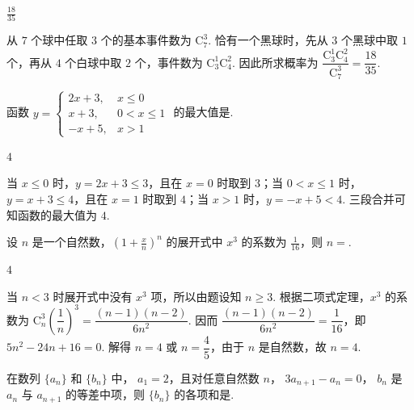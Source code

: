 \begin{answer}
\(\frac{18}{35}\)
\end{answer}

\begin{solution}
从 \(7\) 个球中任取 \(3\) 个的基本事件数为 \(\mathrm C_7^3\). 恰有一个黑球时，先从 \(3\) 个黑球中取 \(1\) 个，再从 \(4\) 个白球中取 \(2\) 个，事件数为 \(\mathrm C_3^1\mathrm C_4^2\). 因此所求概率为 \(\dfrac{\mathrm C_3^1\mathrm C_4^2}{\mathrm C_7^3}=\dfrac{18}{35}\).
\end{solution}

\begin{problem}
函数 \(y=\begin{cases}
2x+3,&x\leqslant0\\
x+3,&0<x\leqslant1\\
-x+5,&x>1
\end{cases}\) 的最大值是\fillinblank{}.
\end{problem}

\begin{answer}
\(4\)
\end{answer}

\begin{solution}
当 \(x\leqslant0\) 时，\(y=2x+3\leqslant3\)，且在 \(x=0\) 时取到 \(3\)；当 \(0<x\leqslant1\) 时，\(y=x+3\leqslant4\)，且在 \(x=1\) 时取到 \(4\)；当 \(x>1\) 时，\(y=-x+5<4\). 三段合并可知函数的最大值为 \(4\).
\end{solution}

\begin{problem}
设 \(n\) 是一个自然数，\(\left(1+\frac{x}{n}\right)^{n} \) 的展开式中 \(x^{3} \) 的系数为 \(\frac{1}{16} \)，则 \(n=\)\fillinblank{}.
\end{problem}

\begin{answer}
\(4\)
\end{answer}

\begin{solution}
当 \(n<3\) 时展开式中没有 \(x^3\) 项，所以由题设知 \(n\geqslant3\). 根据二项式定理，\(x^3\) 的系数为 \(\mathrm C_n^3\left(\dfrac1n\right)^3=\dfrac{(n-1)(n-2)}{6n^2}\). 因而 \(\dfrac{(n-1)(n-2)}{6n^2}=\dfrac1{16}\)，即 \(5n^2-24n+16=0\). 解得 \(n=4\) 或 \(n=\dfrac45\)，由于 \(n\) 是自然数，故 \(n=4\).
\end{solution}

\begin{problem}
在数列 \(\{a_{n}\} \) 和 \(\{b_{n}\} \) 中， \(a_{1}=2 \)，且对任意自然数 \(n\)， \(3a_{n+1}-a_{n}=0 \)， \(b_{n} \) 是 \(a_{n} \) 与 \(a_{n+1} \) 的等差中项，则 \(\{b_{n}\} \) 的各项和是\fillinblank{}.
\end{problem}

